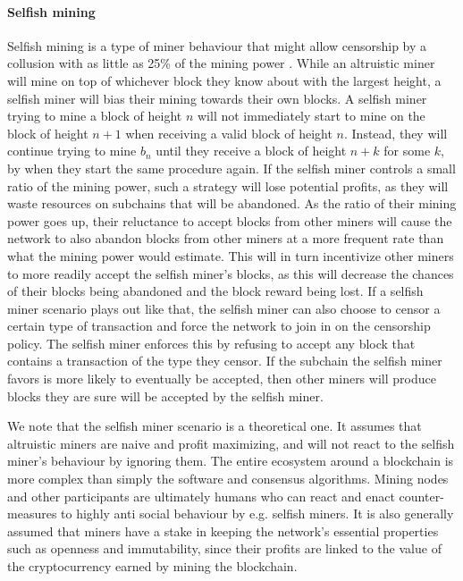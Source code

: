 \paragraph{Selfish mining}
Selfish mining is a type of miner behaviour that might allow censorship by a collusion with as little as 25\% of the mining power \cite{eyal2013majority}. While an altruistic miner will mine on top of whichever block they know about with the largest height, a selfish miner will bias their mining towards their own blocks. A selfish miner trying to mine a block of height $n$ will not immediately start to mine on the block of height $n+1$ when receiving a valid block of height $n$. Instead, they will continue trying to mine $b_n$ until they receive a block of height $n+k$ for some $k$, by when they start the same procedure again. 
If the selfish miner controls a small ratio of the mining power, such a strategy will lose potential profits, as they will waste resources on subchains that will be abandoned. As the ratio of their mining power goes up, their reluctance to accept blocks from other miners will cause the network to also abandon blocks from other miners at a more frequent rate than what the mining power would estimate. This will in turn incentivize other miners to more readily accept the selfish miner's blocks, as this will decrease the chances of their blocks being abandoned and the block reward being lost. 
If a selfish miner scenario plays out like that, the selfish miner can also choose to censor a certain type of transaction and force the network to join in on the censorship policy. The selfish miner enforces this by refusing to accept any block that contains a transaction of the type they censor. If the subchain the selfish miner favors is more likely to eventually be accepted, then other miners will produce blocks they are sure will be accepted by the selfish miner.

We note that the selfish miner scenario is a theoretical one. It assumes that altruistic miners are naive and profit maximizing, and will not react to the selfish miner's behaviour by ignoring them. The entire ecosystem around a blockchain is more complex than simply the software and consensus algorithms. Mining nodes and other participants are ultimately humans who can react and enact counter-measures to highly anti social behaviour by e.g. selfish miners. It is also generally assumed that miners have a stake in keeping the network's essential properties such as openness and immutability, since their profits are linked to the value of the cryptocurrency earned by mining the blockchain.
